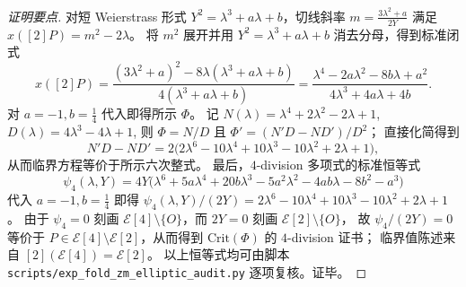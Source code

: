 \begin{proof}[证明要点]
对短 Weierstrass 形式 \(Y^{2}=\lambda^{3}+a\lambda+b\)，切线斜率
\(
m=\frac{3\lambda^{2}+a}{2Y}
\)
满足 \(x([2]P)=m^{2}-2\lambda\)。
将 \(m^{2}\) 展开并用 \(Y^{2}=\lambda^{3}+a\lambda+b\) 消去分母，得到标准闭式
\[
x([2]P)=\frac{(3\lambda^{2}+a)^{2}-8\lambda(\lambda^{3}+a\lambda+b)}{4(\lambda^{3}+a\lambda+b)}
=\frac{\lambda^{4}-2a\lambda^{2}-8b\lambda+a^{2}}{4\lambda^{3}+4a\lambda+4b}.
\]
对 \(a=-1,b=\tfrac14\) 代入即得所示 \(\Phi\)。
记
\(
N(\lambda)=\lambda^{4}+2\lambda^{2}-2\lambda+1
\),
\(
D(\lambda)=4\lambda^{3}-4\lambda+1
\),
则 \(\Phi=N/D\) 且
\(
\Phi'=(N'D-ND')/D^{2}
\)；
直接化简得到
\[
N'D-ND'
=2\bigl(2\lambda^{6}-10\lambda^{4}+10\lambda^{3}-10\lambda^{2}+2\lambda+1\bigr),
\]
从而临界方程等价于所示六次整式。
最后，\(4\)-division 多项式的标准恒等式
\[
\psi_{4}(\lambda,Y)=4Y\bigl(\lambda^{6}+5a\lambda^{4}+20b\lambda^{3}-5a^{2}\lambda^{2}-4ab\lambda-8b^{2}-a^{3}\bigr)
\]
代入 \(a=-1,b=\tfrac14\) 即得
\(
\psi_{4}(\lambda,Y)/(2Y)=2\lambda^{6}-10\lambda^{4}+10\lambda^{3}-10\lambda^{2}+2\lambda+1
\)。
由于 \(\psi_{4}=0\) 刻画 \(\mathcal{E}[4]\setminus\{O\}\)，而 \(2Y=0\) 刻画 \(\mathcal{E}[2]\setminus\{O\}\)，
故 \(\psi_{4}/(2Y)=0\) 等价于 \(P\in\mathcal{E}[4]\setminus\mathcal{E}[2]\)，从而得到 \(\mathrm{Crit}(\Phi)\) 的 \(4\)-division 证书；
临界值陈述来自 \([2](\mathcal{E}[4])=\mathcal{E}[2]\)。
以上恒等式均可由脚本 \texttt{scripts/exp\_fold\_zm\_elliptic\_audit.py} 逐项复核。证毕。
\end{proof}

